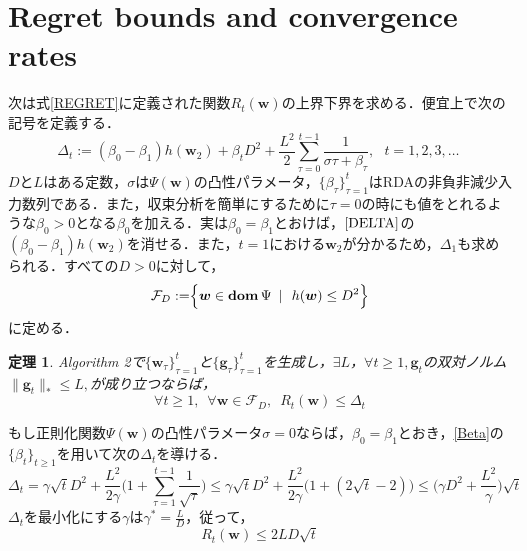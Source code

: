 \documentclass[a4paper,11pt]{jsarticle}
\newtheorem{theorem}{定理}
\numberwithin{theorem}{section}  %
\numberwithin{equation}{section} %
\newcommand{\dom}{\mathop{\mathrm{\bf dom}}\nolimits}
\begin{document}
\section{Regret bounds and convergence rates}
次は式\eqref{REGRET}に定義された関数$R_t(\bm{w})$の上界下界を求める．便宜上で次の記号を定義する．
\begin{equation}
\Delta_t := (\beta_0 - \beta_1)h(\bm{w}_2) + \beta_t D^2 + \frac{L^2}{2} \sum_{\tau = 0}^{t-1} \frac{1}{\sigma\tau + \beta_\tau},\,\,\,\, t=1,2,3,\dots \
\label{DELTA}
\end{equation}
$D$と$L$はある定数，$\sigma$は$\Psi(\bm{w})$の凸性パラメータ，$\{\beta_\tau\}_{\tau=1}^t$はRDAの非負非減少入力数列である．また，収束分析を簡単にするために$\tau=0$の時にも値をとれるような$\beta_0>0$となる$\beta_0$を加える．実は$\beta_0=\beta_1$とおけば，$\eqref{DELTA}$の$(\beta_0 - \beta_1)h(\bm{w}_2)$を消せる．また，$t=1$における$\bm{w}_2$が分かるため，$\Delta_1$も求められる．すべての$D>0$に対して，
\begin{equation}
\mathcal{F}_D := \Bigr\{ \bm{w} \in \dom \Psi \,\,\,|\,\,\,\, h(\bm{w}) \le D^2 \Bigr\}
\end{equation}
に定める．
\begin{theorem}
Algorithm 2で$\{ \bm{w}_\tau \}_{\tau=1}^t $と$\{ \bm{g}_\tau \}_{\tau=1}^t$を生成し，$\exists L$，$\forall t \ge 1,\bm{g}_t$の双対ノルム$\|\bm{g}_t\|_* \le L,$が成り立つならば，
\begin{equation}
\forall t\ge1,\,\,\, \forall \bm{w} \in \mathcal{F}_D,\,\,\, R_t(\bm{w}) \le \Delta_t
\end{equation}
\end{theorem}

もし正則化関数$\Psi(\bm{w})$の凸性パラメータ$\sigma = 0$ならば，$\beta_0 = \beta_1$とおき，\eqref{Beta}の$\{\beta_t\}_{t\ge 1}$を用いて次の$\Delta_t$を導ける．
\begin{equation}
\Delta_t = \gamma \sqrt{t} D^2 + \frac{L^2}{2\gamma}\Bigr( 1+\sum_{\tau=1}^{t-1} \frac{1}{\sqrt{\tau}} \Bigr) \le \gamma \sqrt{t} D^2 + \frac{L^2}{2\gamma} \Bigr( 1+ (2\sqrt{t} -2) \Bigr) \le \Bigr( \gamma D^2 + \frac{L^2}{\gamma} \Bigr)\sqrt{t}
\end{equation}
$\Delta_t$を最小化にする$\gamma$は$\gamma^* = \frac{L}{D}$，従って，
\begin{equation}
R_t(\bm{w}) \le 2LD\sqrt{t}
\end{equation}
\end{document}
